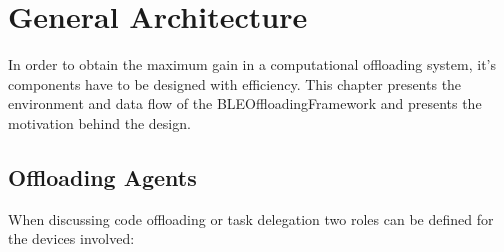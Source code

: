 \chapter{General Architecture}
\label{chapter:architecture}

In order to obtain the maximum gain in a computational offloading system, it's components have to be designed with efficiency. This chapter presents the environment and data flow of the BLEOffloadingFramework and presents the motivation behind the design.

\section{Offloading Agents}
\label{agents}

When discussing code offloading or task delegation two roles can be defined for the devices involved:

